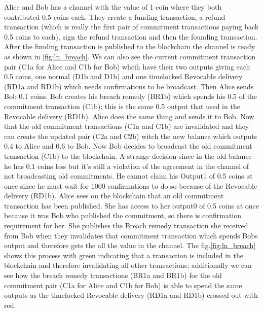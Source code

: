 Alice and Bob has a channel with the value of 1 coin where they both contributed 0.5 coins each. They create a funding transaction, a refund transaction (which is really the first pair of commitment transactions paying back 0.5 coins to each), sign the refund transaction and then the founding transaction. After the funding transaction is published to the blockchain the channel is ready as shown in \cref{fig:ln_breach}. We can also see the current commitment transaction pair (C1a for Alice and C1b for Bob) whcih have their two outputs giving each 0.5 coins, one normal (D1b and D1b) and one timelocked Revocable delivery (RD1a and RD1b) which needs confirmations to be broadcast. Then Alice sends Bob 0.1 coins. Bob creates his breach remedy (BR1b) which spends his 0.5 of the commitment transaction (C1b); this is the same 0.5 output that used in the Revocable delivery (RD1b).
Alice does the same thing and sends it to Bob. Now that the old commitment transactions (C1a and C1b) are invalidated and they can create the updated pair (C2a and C2b) witch the new balance which outputs 0.4 to Alice and 0.6 to Bob. Now Bob decides to broadcast the old commitment transaction (C1b) to the blockchain. A strange decision since in the old balance he has 0.1 coins less but it's still a violation of the agreement in the channel of not broadcasting old commitments. 
He cannot claim his Output1 of 0.5 coins at once since he must wait for 1000 confirmations to do so because of the Revocable delivery (RD1b).
Alice sees on the blockchain that an old commitment transaction has been published. She has access to her output0 of 0.5 coins at once because it was Bob who published the commitment, so there is confirmation requirement for her. She publishes the Breach remedy transaction she received from Bob when they invalidates that commitment transaction which spends Bobs output and therefore gets the all the value in the channel. The fig.\ref{fig:ln_breach} shows this process with green indicating that a transaction is included in the blockchain and therefore invalidating all other transactions; additionally we can see how the breach remedy transactions (BR1a and BR1b) for the old commitment pair (C1a for Alice and C1b for Bob) is able to spend the same outputs as the timelocked Revocable delivery (RD1a and RD1b) crossed out with red.

